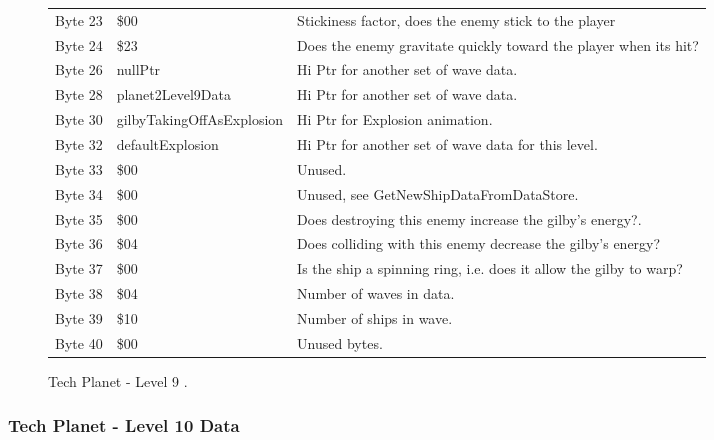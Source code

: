 \begin{figure}[H]
{\begin{adjustbox}{width=12cm}
\begin{tabular}{lll}
 Byte 23 & \$00                       & Stickiness factor, does the enemy stick to the player              \\
 Byte 24 & \$23                       & Does the enemy gravitate quickly toward the player when its hit?   \\
 Byte 26 & nullPtr                   & Hi Ptr for another set of wave data.                               \\
 Byte 28 & planet2Level9Data         & Hi Ptr for another set of wave data.                               \\
 Byte 30 & gilbyTakingOffAsExplosion & Hi Ptr for Explosion animation.                                    \\
 Byte 32 & defaultExplosion          & Hi Ptr for another set of wave data for this level.                \\
 Byte 33 & \$00                       & Unused.                                                            \\
 Byte 34 & \$00                       & Unused, see GetNewShipDataFromDataStore.                           \\
 Byte 35 & \$00                       & Does destroying this enemy increase the gilby's energy?.           \\
 Byte 36 & \$04                       & Does colliding with this enemy decrease the gilby's energy?        \\
 Byte 37 & \$00                       & Is the ship a spinning ring, i.e. does it allow the gilby to warp? \\
 Byte 38 & \$04                       & Number of waves in data.                                           \\
 Byte 39 & \$10                       & Number of ships in wave.                                           \\
 Byte 40 & \$00                       & Unused bytes.                                                      \\
\bottomrule
\end{tabular}

  \end{adjustbox}

  }\caption*{Tech Planet - Level 9
.}
\end{figure}

\clearpage
\subsubsection{Tech Planet - Level 10 Data}

